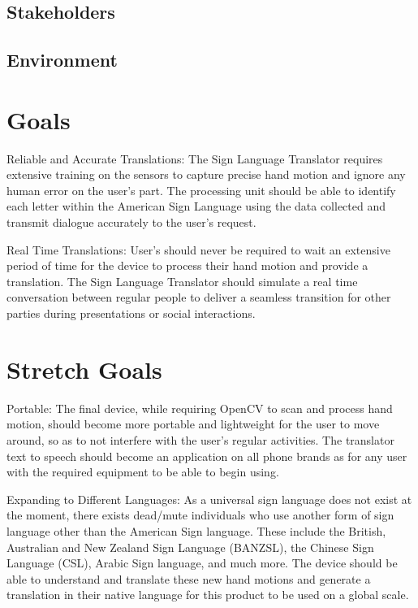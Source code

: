 \documentclass{article}
\begin{document}
\subsection{Stakeholders}

\subsection{Environment}


\section{Goals}

Reliable and Accurate Translations:
The Sign Language Translator requires extensive training on the sensors to capture precise hand motion and ignore any human error on the user’s part. The processing unit should be able to identify each letter within the American Sign Language using the data collected and transmit dialogue accurately to the user’s request.

Real Time Translations:
User’s should never be required to wait an extensive period of time for the device to process their hand motion and provide a translation. The Sign Language Translator should simulate a real time conversation between regular people to deliver a seamless transition for other parties during presentations or social interactions.

\section{Stretch Goals}

Portable:
The final device, while requiring OpenCV to scan and process hand motion, should become more portable and lightweight for the user to move around, so as to not interfere with the user’s regular activities. The translator text to speech should become an application on all phone brands as for any user with the required equipment to be able to begin using.

Expanding to Different Languages:
As a universal sign language does not exist at the moment, there exists dead/mute individuals who use another form of sign language other than the American Sign language. These include the British, Australian and New Zealand Sign Language (BANZSL), the Chinese Sign Language (CSL), Arabic Sign language, and much more. The device should be able to understand and translate these new hand motions and generate a translation in their native language for this product to be used on a global scale.
\end{document}
